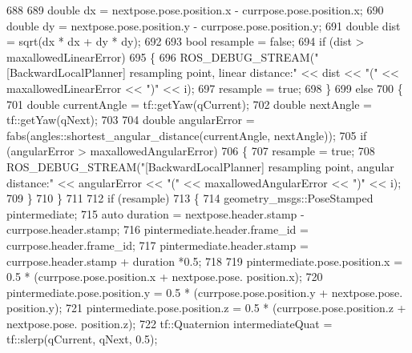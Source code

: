 \begin{DoxyCode}
688 
689                 \textcolor{keywordtype}{double} dx = nextpose.pose.position.x - currpose.pose.position.x;
690                 \textcolor{keywordtype}{double} dy = nextpose.pose.position.y - currpose.pose.position.y;
691                 \textcolor{keywordtype}{double} dist = sqrt(dx * dx + dy * dy);
692 
693                 \textcolor{keywordtype}{bool} resample = \textcolor{keyword}{false};
694                 \textcolor{keywordflow}{if} (dist > maxallowedLinearError)
695                 \{
696                     ROS\_DEBUG\_STREAM(\textcolor{stringliteral}{"[BackwardLocalPlanner] resampling point, linear distance:"} << dist <<
       \textcolor{stringliteral}{"("} << maxallowedLinearError << \textcolor{stringliteral}{")"} << i);
697                     resample = \textcolor{keyword}{true};
698                 \}
699                 \textcolor{keywordflow}{else}
700                 \{
701                     \textcolor{keywordtype}{double} currentAngle = tf::getYaw(qCurrent);
702                     \textcolor{keywordtype}{double} nextAngle = tf::getYaw(qNext);
703 
704                     \textcolor{keywordtype}{double} angularError = fabs(angles::shortest\_angular\_distance(currentAngle, nextAngle));
705                     \textcolor{keywordflow}{if} (angularError > maxallowedAngularError)
706                     \{
707                         resample = \textcolor{keyword}{true};
708                         ROS\_DEBUG\_STREAM(\textcolor{stringliteral}{"[BackwardLocalPlanner] resampling point, angular distance:"} << 
      angularError << \textcolor{stringliteral}{"("} << maxallowedAngularError << \textcolor{stringliteral}{")"} << i);
709                     \}
710                 \}
711 
712                 \textcolor{keywordflow}{if} (resample)
713                 \{
714                     geometry\_msgs::PoseStamped pintermediate;
715                     \textcolor{keyword}{auto} duration = nextpose.header.stamp - currpose.header.stamp;
716                     pintermediate.header.frame\_id = currpose.header.frame\_id;
717                     pintermediate.header.stamp = currpose.header.stamp + duration *0.5;
718 
719                     pintermediate.pose.position.x = 0.5 * (currpose.pose.position.x + nextpose.pose.
      position.x);
720                     pintermediate.pose.position.y = 0.5 * (currpose.pose.position.y + nextpose.pose.
      position.y);
721                     pintermediate.pose.position.z = 0.5 * (currpose.pose.position.z + nextpose.pose.
      position.z);
722                     tf::Quaternion intermediateQuat = tf::slerp(qCurrent, qNext, 0.5);

\end{DoxyCode}
